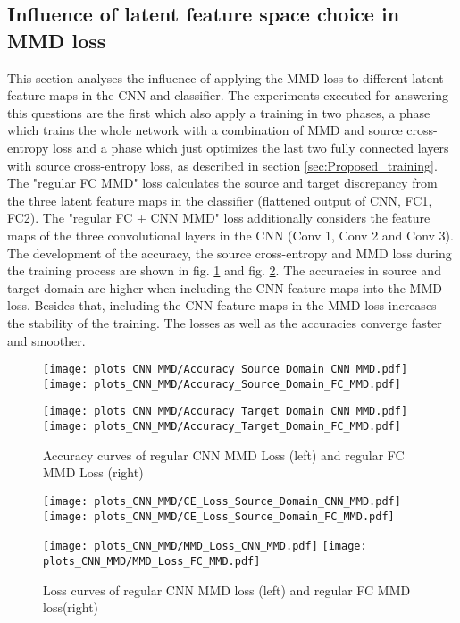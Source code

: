 \subsection{Influence of latent feature space choice in MMD loss}
This section analyses the influence of applying the MMD loss to different latent feature maps in the CNN and classifier. The experiments executed for answering this questions are the first which also apply a training in two phases, a phase which trains the whole network with a combination of MMD and source cross-entropy loss and a phase which just optimizes the last two fully connected layers with source cross-entropy loss, as described in section \ref{sec:Proposed_training}. The "regular FC MMD" loss calculates the source and target discrepancy from the three latent feature maps in the classifier (flattened output of CNN, FC1, FC2). The "regular FC + CNN MMD" loss additionally considers the feature maps of the three convolutional layers in the CNN (Conv 1, Conv 2 and Conv 3). The development of the accuracy, the source cross-entropy and MMD loss during the training process are shown in fig. \ref{fig:accuracy_cnn_and_no_cnn_mmd} and fig. \ref{fig:loss_cnn_and_no_cnn_mmd}. The accuracies in source and target domain are higher when including the CNN feature maps into the MMD loss. Besides that, including the CNN feature maps in the MMD loss increases the stability of the training. The losses as well as the accuracies converge faster and smoother.

\begin{figure}[H]
  \centering
  \texttt{[image: plots\_CNN\_MMD/Accuracy\_Source\_Domain\_CNN\_MMD.pdf]}
  \hspace{.3cm}
  \texttt{[image: plots\_CNN\_MMD/Accuracy\_Source\_Domain\_FC\_MMD.pdf]}

  \vspace{.1cm}

  \texttt{[image: plots\_CNN\_MMD/Accuracy\_Target\_Domain\_CNN\_MMD.pdf]}
  \hspace{.1cm}
  \texttt{[image: plots\_CNN\_MMD/Accuracy\_Target\_Domain\_FC\_MMD.pdf]}

  \caption{Accuracy curves of regular CNN MMD Loss (left) and regular FC MMD Loss (right)}
  \label{fig:accuracy_cnn_and_no_cnn_mmd}
\end{figure}

\begin{figure}[H]
  \centering
  \texttt{[image: plots\_CNN\_MMD/CE\_Loss\_Source\_Domain\_CNN\_MMD.pdf]}
  \hspace{.3cm}
  \texttt{[image: plots\_CNN\_MMD/CE\_Loss\_Source\_Domain\_FC\_MMD.pdf]}

  \vspace{.1cm}

  \texttt{[image: plots\_CNN\_MMD/MMD\_Loss\_CNN\_MMD.pdf]}
  \hspace{.1cm}
  \texttt{[image: plots\_CNN\_MMD/MMD\_Loss\_FC\_MMD.pdf]}

  \caption{Loss curves of regular CNN MMD loss (left) and regular FC MMD loss(right)}
  \label{fig:loss_cnn_and_no_cnn_mmd}
\end{figure}


